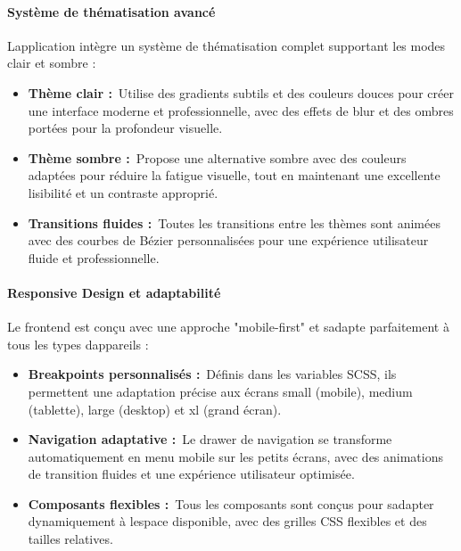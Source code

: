\documentclass[12pt,a4paper,twoside]{report}
\begin{document}
\hypertarget{systuxe8me-de-thuxe9matisation-avancuxe9}{%
\paragraph{Système de thématisation
avancé}\label{systuxe8me-de-thuxe9matisation-avancuxe9}}

L\textquotesingle application intègre un système de thématisation
complet supportant les modes clair et sombre :

\begin{itemize}
\item
  \textbf{Thème clair :}~Utilise des gradients subtils et des couleurs
  douces pour créer une interface moderne et professionnelle, avec des
  effets de blur et des ombres portées pour la profondeur visuelle.
\item
  \textbf{Thème sombre :}~Propose une alternative sombre avec des
  couleurs adaptées pour réduire la fatigue visuelle, tout en maintenant
  une excellente lisibilité et un contraste approprié.
\item
  \textbf{Transitions fluides :}~Toutes les transitions entre les thèmes
  sont animées avec des courbes de Bézier personnalisées pour une
  expérience utilisateur fluide et professionnelle.
\end{itemize}

\hypertarget{responsive-design-et-adaptabilituxe9}{%
\paragraph{Responsive Design et
adaptabilité}\label{responsive-design-et-adaptabilituxe9}}

Le frontend est conçu avec une approche "mobile-first" et
s\textquotesingle adapte parfaitement à tous les types
d\textquotesingle appareils :

\begin{itemize}
\item
  \textbf{Breakpoints personnalisés :}~Définis dans les variables SCSS,
  ils permettent une adaptation précise aux écrans small (mobile),
  medium (tablette), large (desktop) et xl (grand écran).
\item
  \textbf{Navigation adaptative :}~Le drawer de navigation se transforme
  automatiquement en menu mobile sur les petits écrans, avec des
  animations de transition fluides et une expérience utilisateur
  optimisée.
\item
  \textbf{Composants flexibles :}~Tous les composants sont conçus pour
  s\textquotesingle adapter dynamiquement à l\textquotesingle espace
  disponible, avec des grilles CSS flexibles et des tailles relatives.
\end{itemize}
\end{document}
